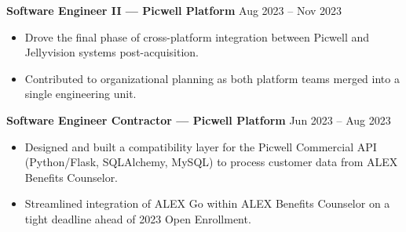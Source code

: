 \documentclass[11pt,letterpaper]{article}
\begin{document}
                                                \vspace{4pt}
                                                \textbf{Software Engineer II --- Picwell Platform} \hfill Aug 2023 -- Nov 2023
                                                \begin{itemize}
                                                    \item Drove the final phase of cross-platform integration between Picwell and Jellyvision systems post-acquisition.
                                                        \item Contributed to organizational planning as both platform teams merged into a single engineering unit.
                                                        \end{itemize}

                                                        \vspace{4pt}
                                                        \textbf{Software Engineer Contractor --- Picwell Platform} \hfill Jun 2023 -- Aug 2023
                                                        \begin{itemize}
                                                            \item Designed and built a compatibility layer for the Picwell Commercial API (Python/Flask, SQLAlchemy, MySQL) to process customer data from ALEX Benefits Counselor.
                                                                \item Streamlined integration of ALEX Go within ALEX Benefits Counselor on a tight deadline ahead of 2023 Open Enrollment.
                                                                \end{itemize}

                                                                \vspace{6pt}
\end{document}
